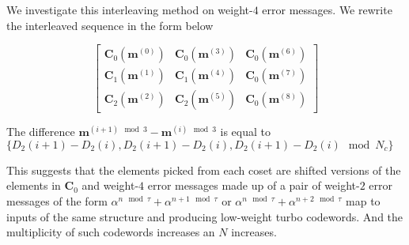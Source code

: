 \documentclass[11pt, oneside, dvipdfmx]{book}
\begin{document}
 We investigate this interleaving method on weight-$4$ error messages. We rewrite the interleaved sequence in the form below
 
 \begin{equation}
\begin{bmatrix}
\mathbf{C}_0(\mathbf{m}^{(0)}) &  \mathbf{C}_0(\mathbf{m}^{(3)}) & \mathbf{C}_0(\mathbf{m}^{(6)})\\
\mathbf{C}_1(\mathbf{m}^{(1)})&\mathbf{C}_1(\mathbf{m}^{(4)}) & \mathbf{C}_0(\mathbf{m}^{(7)})\\
\mathbf{C}_2(\mathbf{m}^{(2)}) & \mathbf{C}_2(\mathbf{m}^{(5)})  & \mathbf{C}_0(\mathbf{m}^{(8)})
\end{bmatrix}
\end{equation}


The difference  $\mathbf{m}^{(i+1) \mod 3}- \mathbf{m}^{(i) \mod 3}$ is equal to $\{D_2(i+1)-D_2(i),D_2(i+1)-D_2(i),D_2(i+1)-D_2(i) \mod N_c\}$ 



This suggests that the elements picked from each coset are shifted versions of the elements in $\mathbf{C}_0$ and weight-$4$  error messages made up of a pair of weight-$2$ error messages of the form $\alpha^{n \mod \tau} + \alpha^{n+1 \mod \tau} $ or  $\alpha^{n \mod \tau} + \alpha^{n+2 \mod \tau} $ map to inputs of the same structure and producing low-weight turbo codewords. And the multiplicity of such codewords increases an $N$ increases.
 
 
\end{document}
